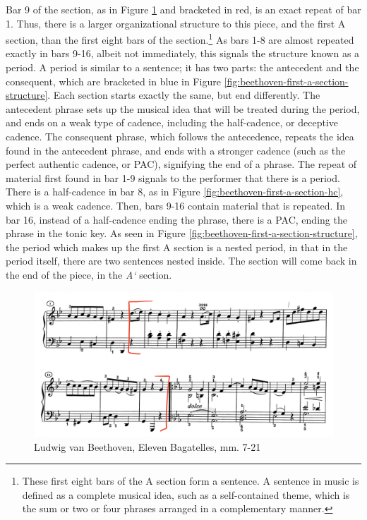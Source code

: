 Bar 9 of the section, as in Figure \ref{fig:beethoven-first-a-section-bars-nine-to-sixteen}\autocite{Henle_1978} and bracketed in red, is an exact repeat of bar 1. Thus, there is a larger organizational structure to this piece, and the first A section, than the first eight bars of the section.\footnote{These first eight bars of the A section form a sentence. A sentence in music is defined as a complete musical idea, such as a self-contained theme, which is the sum or two or four phrases arranged in a complementary manner.} As bars 1-8 are almost repeated exactly in bars 9-16, albeit not immediately, this signals the structure known as a period. A period is similar to a sentence; it has two parts: the antecedent and the consequent, which are bracketed in blue in Figure \ref{fig:beethoven-first-a-section-structure}\autocite{Henle_1978}. Each section starts exactly the same, but end differently. The antecedent phrase sets up the musical idea that will be treated during the period, and ends on a weak type of cadence, including the half-cadence, or deceptive cadence. The consequent phrase, which follows the antecedence, repeats the idea found in the antecedent phrase, and ends with a stronger cadence (such as the perfect authentic cadence, or PAC), signifying the end of a phrase. The repeat of material first found in bar 1-9 signals to the performer that there is a period. There is a half-cadence in bar 8, as in Figure \ref{fig:beethoven-first-a-section-hc}\autocite{Henle_1978}, which is a weak cadence. Then, bars 9-16 contain material that is repeated. In bar 16, instead of a half-cadence ending the phrase, there is a PAC, ending the phrase in the tonic key. As seen in Figure \ref{fig:beethoven-first-a-section-structure}\autocite{Henle_1978}, the period which makes up the first A section is a nested period, in that in the period itself, there are two sentences nested inside. The section will come back in the end of the piece, in the \textit{A`} section. 

\begin{figure}[h]
  \centering
  \includegraphics[width=\textwidth]{figures/beethoven-first-a-section-bars-nine-to-sixteen.jpg}
  \caption{Ludwig van Beethoven, Eleven Bagatelles, mm. 7-21}
  \label{fig:beethoven-first-a-section-bars-nine-to-sixteen}
\end{figure}

